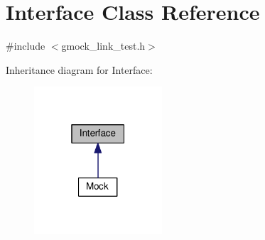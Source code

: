 \hypertarget{classInterface}{}\section{Interface Class Reference}
\label{classInterface}


{\ttfamily \#include $<$gmock\+\_\+link\+\_\+test.\+h$>$}



Inheritance diagram for Interface\+:
\nopagebreak
\begin{figure}[H]
\begin{center}
\leavevmode
\includegraphics[width=135pt]{classInterface__inherit__graph}
\end{center}
\end{figure}
